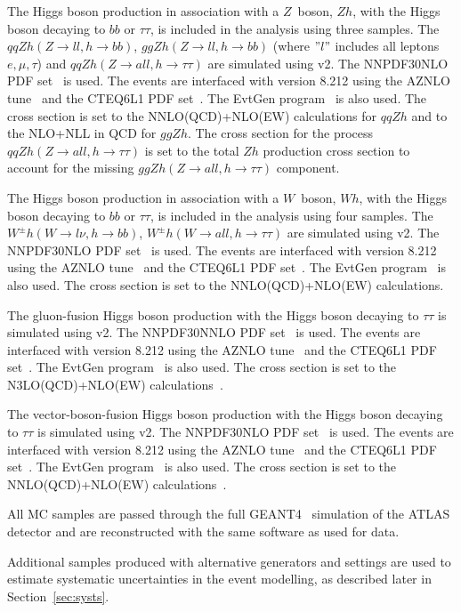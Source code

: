 The Higgs boson production in association with a $Z$\ boson, $Zh$, with the Higgs boson decaying to $bb$ or $\tau\tau$, is included in the analysis using three samples. The $qq Zh(Z\rightarrow ll, h\rightarrow bb)$, $gg Zh(Z\rightarrow ll,h\rightarrow bb)$ (where $"l"$ includes all leptons $e,\mu,\tau$) and $qq Zh(Z\rightarrow all, h\rightarrow \tau\tau)$ are simulated using \POWHEGBOX v2. The NNPDF30NLO PDF set~\cite{NNPDF} is used. The events are interfaced with  version 8.212 using the AZNLO tune~\cite{AZNLOtune} and the CTEQ6L1 PDF set~\cite{CTEQ6L1}. The EvtGen program~\cite{EvtGen} is also used. The cross section is set to the NNLO(QCD)+NLO(EW) calculations for $qqZh$ and to the NLO+NLL in QCD for $ggZh$. The cross section for the process $qq Zh(Z\rightarrow all, h\rightarrow \tau\tau)$ is set to the total $Zh$ production cross section to account for the missing $ggZh(Z\rightarrow all, h\rightarrow \tau\tau)$ component.

The Higgs boson production in association with a $W$\ boson, $Wh$, with the Higgs boson decaying to $bb$ or $\tau\tau$, is included in the analysis using four samples. The $W^{\pm}h(W\rightarrow l \nu, h\rightarrow bb)$, $W^{\pm}h(W\rightarrow all,h\rightarrow \tau\tau)$ are simulated using \POWHEGBOX v2. The NNPDF30NLO PDF set~\cite{NNPDF} is used. The events are interfaced with  version 8.212 using the AZNLO tune~\cite{AZNLOtune} and the CTEQ6L1 PDF set~\cite{CTEQ6L1}. The EvtGen program~\cite{EvtGen} is also used. The cross section is set to the NNLO(QCD)+NLO(EW) calculations.

The gluon-fusion Higgs boson production with the Higgs boson decaying to $\tau\tau$ is simulated using \POWHEGBOX v2. The NNPDF30NNLO PDF set~\cite{NNPDF} is used. The events are interfaced with  version 8.212 using the AZNLO tune~\cite{AZNLOtune} and the CTEQ6L1 PDF set~\cite{CTEQ6L1}. The EvtGen program~\cite{EvtGen} is also used. The cross section is set to the N3LO(QCD)+NLO(EW) calculations~\cite{Hxsec}.%

The vector-boson-fusion Higgs boson production with the Higgs boson decaying to $\tau\tau$ is simulated using \POWHEGBOX v2. The NNPDF30NLO PDF set~\cite{NNPDF} is used. The events are interfaced with  version 8.212 using the AZNLO tune~\cite{AZNLOtune} and the CTEQ6L1 PDF set~\cite{CTEQ6L1}. The EvtGen program~\cite{EvtGen} is also used. The cross section is set to the NNLO(QCD)+NLO(EW) calculations~\cite{Hxsec}. %


All MC samples are passed through the full GEANT4~\cite{Geant4,ATLASSIM} simulation of the ATLAS detector and are reconstructed with the same software as used for data.

Additional samples produced with alternative generators and settings are used to estimate systematic uncertainties in the event modelling, as described later in Section~\ref{sec:systs}.
